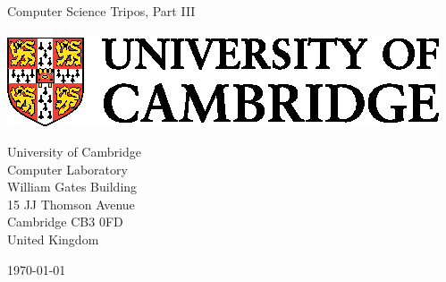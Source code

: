 \begin{titlepage} 

\begin{center}
\noindent
\huge
\dissertationtitle \\
\end{center}

\begin{center}
\noindent
\huge
\authorname \\
\Large
Computer Science Tripos, Part III \\
\authorcollege      \\[24pt]
\includegraphics{CUni3.eps}
\end{center}

\vspace{24pt} 

\begin{center}
\noindent
\large

\end{center}

\begin{center}
\noindent
University of Cambridge \\
Computer Laboratory     \\
William Gates Building  \\
15 JJ Thomson Avenue    \\
Cambridge CB3 0FD       \\
{\sc United Kingdom}    \\
\end{center}


\begin{center}
\noindent
\today
\end{center}

\end{titlepage} 

\newpage
\vspace*{\fill}
